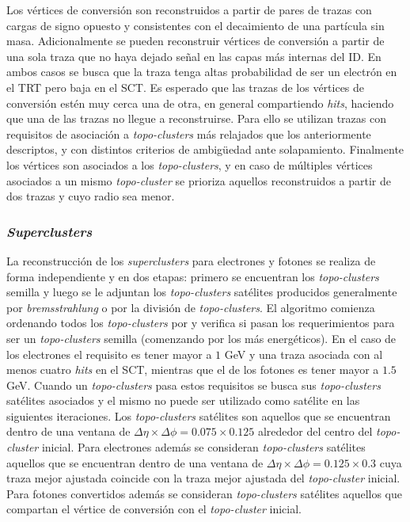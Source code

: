 Los vértices de conversión son reconstruidos a partir de pares de trazas con cargas de signo opuesto y consistentes con el decaimiento de una partícula sin masa. Adicionalmente se pueden reconstruir vértices de conversión a partir de una sola traza que no haya dejado señal en las capas más internas del ID. En ambos casos se busca que la traza tenga altas probabilidad de ser un electrón en el TRT \cite{trt} pero baja en el SCT. Es esperado que las trazas de los vértices de conversión estén muy cerca una de otra, en general compartiendo \textit{hits}, haciendo que una de las trazas no llegue a reconstruirse. Para ello se utilizan trazas con requisitos de asociación a \textit{topo-clusters} más relajados que los anteriormente descriptos, y con distintos criterios de ambigüedad ante solapamiento. Finalmente los vértices son asociados a los \textit{topo-clusters}, y en caso de múltiples vértices asociados a un mismo \textit{topo-cluster} se prioriza aquellos reconstruidos a partir de dos trazas y cuyo radio sea menor.

\subsubsection{\textit{Superclusters}}

La reconstrucción de los \textit{superclusters} para electrones y fotones se realiza de forma independiente y en dos etapas: primero se encuentran los \textit{topo-clusters} semilla  y luego se le adjuntan los \textit{topo-clusters} satélites producidos generalmente por \textit{bremsstrahlung} o por la división de \textit{topo-clusters}. El algoritmo comienza ordenando todos los \textit{topo-clusters} por \ET y verifica si pasan los requerimientos para ser un \textit{topo-clusters} semilla (comenzando por los más energéticos). En el caso de los electrones el requisito es tener \ET mayor a $1$ GeV y una traza asociada con al menos cuatro \textit{hits} en el SCT, mientras que el de los fotones es tener \ET mayor a $1.5$ GeV. Cuando un \textit{topo-clusters} pasa estos requisitos se busca sus \textit{topo-clusters} satélites asociados y el mismo no puede ser utilizado como satélite en las siguientes iteraciones. Los \textit{topo-clusters} satélites son aquellos que se encuentran dentro de una ventana de $\Delta\eta\times\Delta\phi=0.075\times0.125$ alrededor del centro del \textit{topo-cluster} inicial. Para electrones además se consideran \textit{topo-clusters} satélites aquellos que se encuentran dentro de una ventana de $\Delta\eta\times\Delta\phi=0.125\times0.3$ cuya traza mejor ajustada coincide con la traza mejor ajustada del \textit{topo-cluster} inicial. Para fotones convertidos además se consideran \textit{topo-clusters} satélites aquellos que compartan el vértice de conversión con el \textit{topo-cluster} inicial. 


